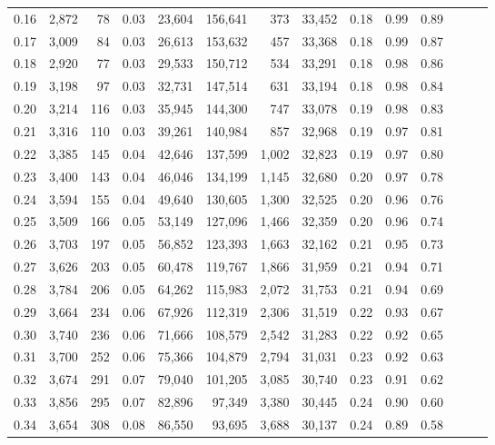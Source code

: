 \begin{tabular}{rrrrrrrrrrrrrr}
0.16 &  2,872 &   78 &  0.03 &   23,604 &  156,641 &     373 &  33,452 &  0.18 &  0.99 &      0.89 \\
0.17 &  3,009 &   84 &  0.03 &   26,613 &  153,632 &     457 &  33,368 &  0.18 &  0.99 &      0.87 \\
0.18 &  2,920 &   77 &  0.03 &   29,533 &  150,712 &     534 &  33,291 &  0.18 &  0.98 &      0.86 \\
0.19 &  3,198 &   97 &  0.03 &   32,731 &  147,514 &     631 &  33,194 &  0.18 &  0.98 &      0.84 \\
0.20 &  3,214 &  116 &  0.03 &   35,945 &  144,300 &     747 &  33,078 &  0.19 &  0.98 &      0.83 \\
0.21 &  3,316 &  110 &  0.03 &   39,261 &  140,984 &     857 &  32,968 &  0.19 &  0.97 &      0.81 \\
0.22 &  3,385 &  145 &  0.04 &   42,646 &  137,599 &   1,002 &  32,823 &  0.19 &  0.97 &      0.80 \\
0.23 &  3,400 &  143 &  0.04 &   46,046 &  134,199 &   1,145 &  32,680 &  0.20 &  0.97 &      0.78 \\
0.24 &  3,594 &  155 &  0.04 &   49,640 &  130,605 &   1,300 &  32,525 &  0.20 &  0.96 &      0.76 \\
0.25 &  3,509 &  166 &  0.05 &   53,149 &  127,096 &   1,466 &  32,359 &  0.20 &  0.96 &      0.74 \\
0.26 &  3,703 &  197 &  0.05 &   56,852 &  123,393 &   1,663 &  32,162 &  0.21 &  0.95 &      0.73 \\
0.27 &  3,626 &  203 &  0.05 &   60,478 &  119,767 &   1,866 &  31,959 &  0.21 &  0.94 &      0.71 \\
0.28 &  3,784 &  206 &  0.05 &   64,262 &  115,983 &   2,072 &  31,753 &  0.21 &  0.94 &      0.69 \\
0.29 &  3,664 &  234 &  0.06 &   67,926 &  112,319 &   2,306 &  31,519 &  0.22 &  0.93 &      0.67 \\
0.30 &  3,740 &  236 &  0.06 &   71,666 &  108,579 &   2,542 &  31,283 &  0.22 &  0.92 &      0.65 \\
0.31 &  3,700 &  252 &  0.06 &   75,366 &  104,879 &   2,794 &  31,031 &  0.23 &  0.92 &      0.63 \\
0.32 &  3,674 &  291 &  0.07 &   79,040 &  101,205 &   3,085 &  30,740 &  0.23 &  0.91 &      0.62 \\
0.33 &  3,856 &  295 &  0.07 &   82,896 &   97,349 &   3,380 &  30,445 &  0.24 &  0.90 &      0.60 \\
0.34 &  3,654 &  308 &  0.08 &   86,550 &   93,695 &   3,688 &  30,137 &  0.24 &  0.89 &      0.58 \\

\end{tabular}
